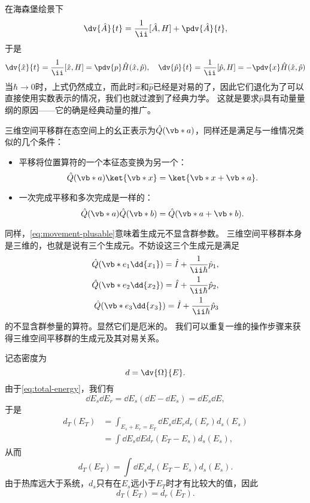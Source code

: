在海森堡绘景下
\[
    \dv{\hat{A}}{t} = \frac{1}{\ii} [\hat{A}, H] + \pdv{\hat{A}}{t},
\]
于是
\[
    \dv{\hat{x}}{t} = \frac{1}{\ii} [\hat{x}, H] = \pdv{p} \hat{H}(\hat{x}, \hat{p}), \quad
    \dv{\hat{p}}{t} = \frac{1}{\ii} [\hat{p}, H] = -\pdv{x} \hat{H}(\hat{x}, \hat{p})
\]
当$\hbar \to 0$时，上式仍然成立，而此时$\hat{x}$和$\hat{p}$已经是对易的了，因此它们退化为了可以直接使用实数表示的情况，我们也就过渡到了经典力学。
这就是要求$\hat{p}$具有动量量纲的原因——它的确是经典动量的推广。

三维空间平移群在态空间上的幺正表示为$\hat{Q}(\vb*{a})$，同样还是满足与一维情况类似的几个条件：
\begin{itemize}
    \item 平移将位置算符的一个本征态变换为另一个：
    \begin{equation}
        \hat{Q}(\vb*{a}) \ket{\vb*{x}} = \ket{\vb*{x} + \vb*{a}}.
    \end{equation}
    \item 一次完成平移和多次完成是一样的：
    \begin{equation}
        \hat{Q}(\vb*{a}) \hat{Q}(\vb*{b}) = \hat{Q}(\vb*{a} + \vb*{b}).
        \label{eq:movement-plusable}
    \end{equation}
\end{itemize}
同样，\eqref{eq:movement-plusable}意味着生成元不显含群参数。
三维空间平移群本身是三维的，也就是说有三个生成元。不妨设这三个生成元是满足
\begin{equation}
    \begin{split}
        \hat{Q}(\vb*{e}_1 \dd{x_1}) = \hat{I} + \frac{1}{\ii \hbar} \hat{p}_1, \\
        \hat{Q}(\vb*{e}_2 \dd{x_2}) = \hat{I} + \frac{1}{\ii \hbar} \hat{p}_2, \\
        \hat{Q}(\vb*{e}_3 \dd{x_3}) = \hat{I} + \frac{1}{\ii \hbar} \hat{p}_3
    \end{split} 
\end{equation}
的不显含群参量的算符。显然它们是厄米的。
我们可以重复一维的操作步骤来获得三维空间平移群的生成元及其对易关系。


记态密度为 %
\begin{equation}
    d = \dv{\Omega}{E}.
\end{equation}
由于\eqref{eq:total-energy}，我们有
\[
    \dd{E_s} \dd{E_r} = \dd{E_s} (\dd{E} - \dd{E_s}) = \dd{E_s} \dd{E},
\]
于是
\[
    \begin{aligned}
        d_T (E_T) &= \int_{E_s + E_r = E_T} \dd{E_s} \dd{E_r} d_r (E_r) d_s (E_s) \\
        &= \int \dd{E_s} \dd{E} d_r (E_T - E_s) d_s (E_s),
    \end{aligned}
\]
从而
\[
    d_T (E_T) = \int \dd{E_s} d_r (E_T - E_s) d_s (E_s).
\]
由于热库远大于系统，$d_s$只有在$E_s$远小于$E_T$时才有比较大的值，因此
\begin{equation}
    d_T (E_T) = d_r (E_T).
\end{equation}

